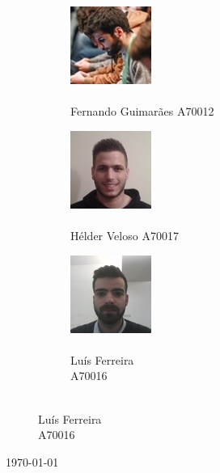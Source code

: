 \documentclass[../tp3.tex]{subfiles}
\begin{document}
\begin{titlepage}
\begin{figure}[H]
\captionsetup[subfigure]{labelformat=empty}
\begin{subfigure}{.4\textwidth}
\centering
\includegraphics[scale=1]{../imagens/nando.jpg}
\caption{\\ \centering \large Fernando Guimarães  A70012}
\end{subfigure}%
\begin{subfigure}{.3\textwidth}
\centering
\includegraphics[scale=1]{../imagens/rafael.jpg}
\caption{\\ \centering \large Hélder Veloso  A70017}
\end{subfigure}%
\begin{subfigure}{.3\textwidth}
\centering
\includegraphics[scale=1]{../imagens/luisfilipe.jpg}
\caption{\\ \centering \large Luís Ferreira \\ A70016}
\end{subfigure}%
\end{figure}%

{\large \today}\\%



\vfill %

\end{titlepage}
\end{document}
